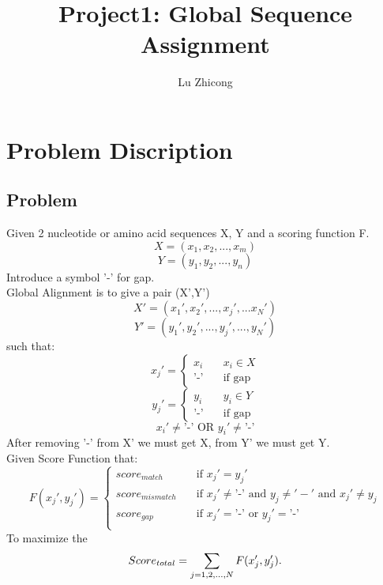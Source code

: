 \documentclass[a4paper, 12pt, one column]{article}
\title{Project1: Global Sequence Assignment}
\author{Lu Zhicong}
\begin{document}
\maketitle


\section{Problem Discription}
\subsection{Problem}
Given 2 nucleotide or amino acid sequences X, Y and a scoring function F.\\
\[
    X=(x_1, x_2, ..., x_m)
\]
\[
    Y=(y_1, y_2, ..., y_n)
\]
Introduce a symbol '-' for gap.\\
Global Alignment is to give a pair (X',Y')\\
\[
    X'=(x_1', x_2', ..., x_j', ... x_N')
\]
\[
    Y'=(y_1', y_2', ..., y_j', ..., y_N')
\]
such that:
\[
    x_j' =
    \begin{cases}
        x_i \quad & x_i \in X\\
        \text{'-'} \quad & \textrm{if gap }
    \end{cases}
\]
\[
    y_j' =
    \begin{cases}
        y_i \quad & y_i \in Y\\
        \text{'-'} \quad & \textrm{if gap }
    \end{cases}
\]
\[
    x_i' \neq \text{'-'} \textrm{   OR  } y_i' \neq \text{'-'}
\]
After removing '-' from X' we must get X, from Y' we must get Y.\\
Given Score Function that: \\
\[
    F(x_j', y_j') = 
    \begin{cases}
        score_{match} \quad & \textrm{if } x_j' = y_j' \\
        score_{mismatch} \quad & \textrm{if } x_j' \neq \text{'-'} \text{ and } y_j \neq '-' \text{ and } x_j' \neq y_j  \\
        score_{gap} \quad & \textrm{if } x_j' = \text{'-'} \text{ or } y_j' = \text{'-'} \\
    \end{cases}
\]
To maximize the 
\[
    Score_{total} = \sum_{j=1,2,...,N}{F(x_j', y_j')}  . \\
\]
\end{document}
